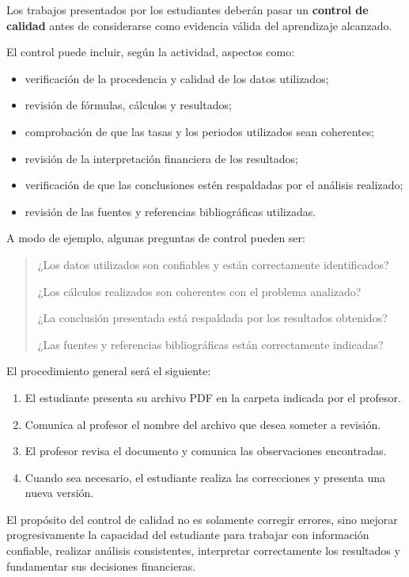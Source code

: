 \documentclass[10pt]{article}
\begin{document}
Los trabajos presentados por los estudiantes deberán pasar un
\textbf{control de calidad} antes de considerarse como evidencia válida
del aprendizaje alcanzado.

El control puede incluir, según la actividad, aspectos como:

\begin{itemize}
    \item verificación de la procedencia y calidad de los datos utilizados;
    \item revisión de fórmulas, cálculos y resultados;
    \item comprobación de que las tasas y los periodos utilizados sean coherentes;
    \item revisión de la interpretación financiera de los resultados;
    \item verificación de que las conclusiones estén respaldadas por el análisis realizado;
    \item revisión de las fuentes y referencias bibliográficas utilizadas.
\end{itemize}

A modo de ejemplo, algunas preguntas de control pueden ser:

\begin{quote}
¿Los datos utilizados son confiables y están correctamente identificados?

¿Los cálculos realizados son coherentes con el problema analizado?

¿La conclusión presentada está respaldada por los resultados obtenidos?

¿Las fuentes y referencias bibliográficas están correctamente indicadas?
\end{quote}

El procedimiento general será el siguiente:

\begin{enumerate}
    \item El estudiante presenta su archivo PDF en la carpeta indicada por el profesor.
    \item Comunica al profesor el nombre del archivo que desea someter a revisión.
    \item El profesor revisa el documento y comunica las observaciones encontradas.
    \item Cuando sea necesario, el estudiante realiza las correcciones y presenta una nueva versión.
\end{enumerate}

El propósito del control de calidad no es solamente corregir errores,
sino mejorar progresivamente la capacidad del estudiante para trabajar
con información confiable, realizar análisis consistentes, interpretar
correctamente los resultados y fundamentar sus decisiones financieras.\parencite{armoa2026conceptos,armoa2026ejercicios}





\newpage
{}
\printbibliography[title={Bibliografía}]
\end{document}
